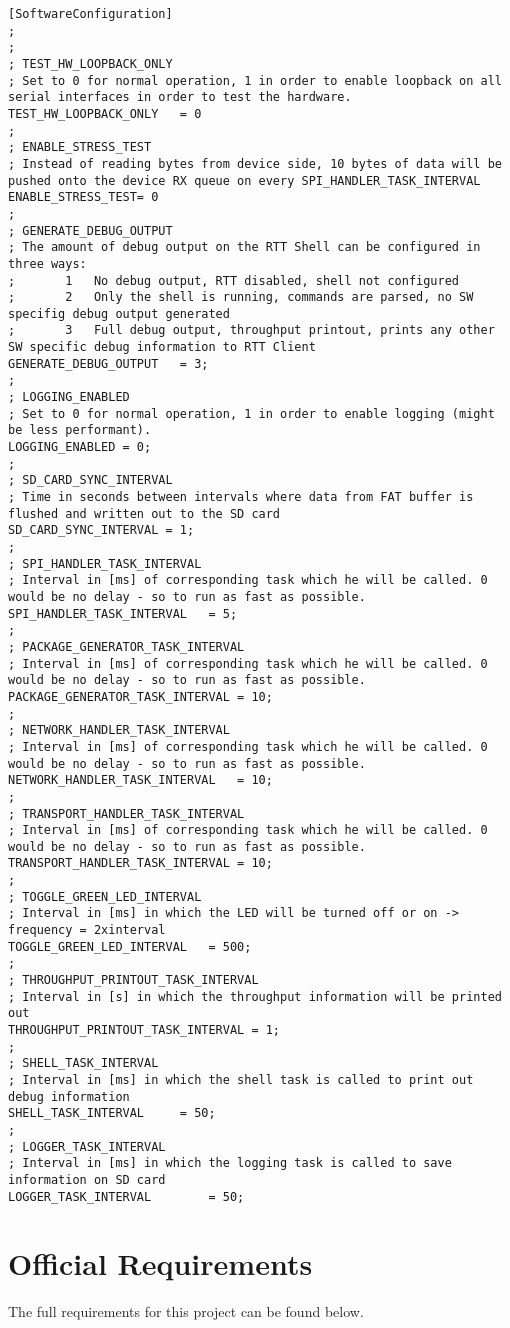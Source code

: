 \begin{lstlisting}
[SoftwareConfiguration]
;
;
; TEST_HW_LOOPBACK_ONLY
; Set to 0 for normal operation, 1 in order to enable loopback on all serial interfaces in order to test the hardware.
TEST_HW_LOOPBACK_ONLY	= 0
;
; ENABLE_STRESS_TEST
; Instead of reading bytes from device side, 10 bytes of data will be pushed onto the device RX queue on every SPI_HANDLER_TASK_INTERVAL
ENABLE_STRESS_TEST= 0
;
; GENERATE_DEBUG_OUTPUT
; The amount of debug output on the RTT Shell can be configured in three ways:
;		1	No debug output, RTT disabled, shell not configured
;		2	Only the shell is running, commands are parsed, no SW specifig debug output generated
;		3	Full debug output, throughput printout, prints any other SW specific debug information to RTT Client
GENERATE_DEBUG_OUTPUT	= 3;
;
; LOGGING_ENABLED
; Set to 0 for normal operation, 1 in order to enable logging (might be less performant).
LOGGING_ENABLED	= 0;
;
; SD_CARD_SYNC_INTERVAL
; Time in seconds between intervals where data from FAT buffer is flushed and written out to the SD card
SD_CARD_SYNC_INTERVAL = 1;
;
; SPI_HANDLER_TASK_INTERVAL
; Interval in [ms] of corresponding task which he will be called. 0 would be no delay - so to run as fast as possible.
SPI_HANDLER_TASK_INTERVAL	= 5;
;
; PACKAGE_GENERATOR_TASK_INTERVAL
; Interval in [ms] of corresponding task which he will be called. 0 would be no delay - so to run as fast as possible.
PACKAGE_GENERATOR_TASK_INTERVAL	= 10;
;
; NETWORK_HANDLER_TASK_INTERVAL
; Interval in [ms] of corresponding task which he will be called. 0 would be no delay - so to run as fast as possible.
NETWORK_HANDLER_TASK_INTERVAL	= 10;
;
; TRANSPORT_HANDLER_TASK_INTERVAL
; Interval in [ms] of corresponding task which he will be called. 0 would be no delay - so to run as fast as possible.
TRANSPORT_HANDLER_TASK_INTERVAL	= 10;
;
; TOGGLE_GREEN_LED_INTERVAL
; Interval in [ms] in which the LED will be turned off or on -> frequency = 2xinterval
TOGGLE_GREEN_LED_INTERVAL	= 500;
;
; THROUGHPUT_PRINTOUT_TASK_INTERVAL
; Interval in [s] in which the throughput information will be printed out
THROUGHPUT_PRINTOUT_TASK_INTERVAL = 1;
;
; SHELL_TASK_INTERVAL
; Interval in [ms] in which the shell task is called to print out debug information
SHELL_TASK_INTERVAL		= 50;
;
; LOGGER_TASK_INTERVAL
; Interval in [ms] in which the logging task is called to save information on SD card
LOGGER_TASK_INTERVAL		= 50;
\end{lstlisting}
%
%
%
%
%
%
%
%
%
%
%
%
%
\chapter{Official Requirements}\label{app:txtRequirements}
The full requirements for this project can be found below.
